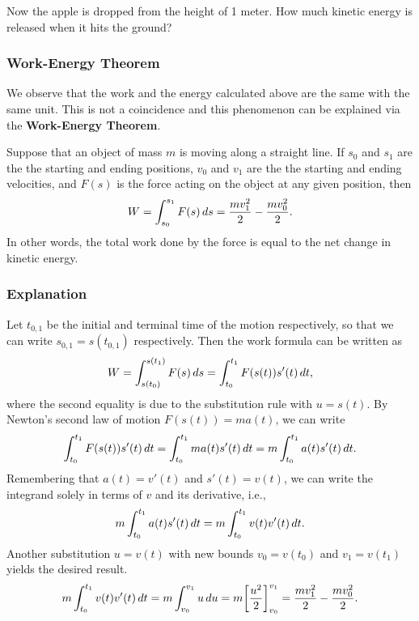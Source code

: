 \documentclass[10pt,t,handout,ignorenonframetext,aspectratio=169]{beamer}
\begin{document}
\begin{frame}
  \vs
  \begin{example}
    Now the apple is dropped from the height of 1 meter. How much
    kinetic energy is released when it hits the ground?
  \end{example}
\end{frame}

\begin{frame}
  \frametitle{Work-Energy Theorem}
  We observe that the work and the energy calculated above are the
  same with the same unit. This is not a coincidence and this
  phenomenon can be explained via the \textbf{Work-Energy Theorem}.

  \begin{thm}
    Suppose that an object of mass $m$ is moving along a straight
    line. If $s_0$ and $s_1$ are the the starting and ending positions,
    $v_0$ and $v_1$ are the the starting and ending velocities, and
    $F(s)$ is the force acting on the object at any given position,
    then
    \[
      W = \int_{s_0}^{s_1} F(s) \mathop{}\!d s
      = \frac{m v_1^2}{2} - \frac{m v_0^2}{2}.
    \]
    In other words, the total work done by the force is equal to the net
    change in kinetic energy.
  \end{thm}
\end{frame}

\begin{frame}
  \frametitle{Explanation}
  \begingroup
  \footnotesize
  Let $t_{0,1}$ be the initial and terminal time of the motion
  respectively, so that we can write $s_{0,1} = s(t_{0,1})$
  respectively. Then the work formula can be written as
  \[
    W = \int_{s(t_0)}^{s(t_1)} F(s) \mathop{}\!d s = \int_{t_0}^{t_1} F(s(t)) s'(t) \mathop{}\!d t ,
  \]
  where the second equality is due to the substitution rule with
  $u = s(t)$. By Newton's second law of motion
  $F(s(t)) = m a(t)$, we can write
  \[
    \int_{t_0}^{t_1} F(s(t)) s'(t) \mathop{}\!d t = \int_{t_0}^{t_1} m a(t) s'(t) \mathop{}\!d t
    = m \int_{t_0}^{t_1} a(t) s'(t) \mathop{}\!d t .
  \]
  Remembering that $a(t) = v'(t)$ and $s'(t) = v(t)$, we can write the
  integrand solely in terms of $v$ and its derivative, i.e.,
  \[
    m \int_{t_0}^{t_1} a(t) s'(t) \mathop{}\!d t = m \int_{t_0}^{t_1} v(t) v'(t) \mathop{}\!d t .
  \]
  Another substitution $u = v(t)$ with new bounds $v_0 = v(t_0)$ and
  $v_1 = v(t_1)$ yields the desired result.
  \[
    m \int_{t_0}^{t_1} v(t) v'(t) \mathop{}\!d t = m \int_{v_0}^{v_1} u \mathop{}\!d u
    = m \bigg[  \frac{u^2}{2}  \bigg]_{v_0}^{v_1}
    = \frac{m v_1^2}{2} - \frac{m v_0^2}{2}.
  \]
  \endgroup
\end{frame}
\end{document}
